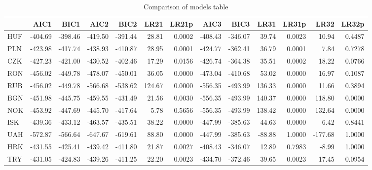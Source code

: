 \documentclass[12pt, a4paper, oneside]{article} %
\begin{document}

\begin{landscape}
\begin{table}[ht]
\centering
\begin{tabular}{l|rrrrrrrrrrrr}
  \hline
 & AIC1 & BIC1 & AIC2 & BIC2 & LR21 & LR21p & AIC3 & BIC3 & LR31 & LR31p & LR32 & LR32p \\ 
  \hline
HUF & -404.69 & -398.46 & -419.50 & -391.44 & 28.81 & 0.0002 & -408.43 & -346.07 & 39.74 & 0.0023 & 10.94 & 0.4487 \\ 
  PLN & -423.98 & -417.74 & -438.93 & -410.87 & 28.95 & 0.0001 & -424.77 & -362.41 & 36.79 & 0.0001 & 7.84 & 0.7278 \\ 
  CZK & -427.23 & -421.00 & -430.52 & -402.46 & 17.29 & 0.0156 & -426.74 & -364.38 & 35.51 & 0.0002 & 18.22 & 0.0766 \\ 
  RON & -456.02 & -449.78 & -478.07 & -450.01 & 36.05 & 0.0000 & -473.04 & -410.68 & 53.02 & 0.0000 & 16.97 & 0.1087 \\ 
  RUB & -456.02 & -449.78 & -566.68 & -538.62 & 124.67 & 0.0000 & -556.35 & -493.99 & 136.33 & 0.0000 & 11.66 & 0.3894 \\ 
  BGN & -451.98 & -445.75 & -459.55 & -431.49 & 21.56 & 0.0030 & -556.35 & -493.99 & 140.37 & 0.0000 & 118.80 & 0.0000 \\ 
  NOK & -453.92 & -447.69 & -445.70 & -417.64 & 5.78 & 0.5656 & -556.35 & -493.99 & 138.42 & 0.0000 & 132.64 & 0.0000 \\ 
  ISK & -439.36 & -433.12 & -463.57 & -435.51 & 38.22 & 0.0000 & -447.99 & -385.63 & 44.63 & 0.0000 & 6.42 & 0.8441 \\ 
  UAH & -572.87 & -566.64 & -647.67 & -619.61 & 88.80 & 0.0000 & -447.99 & -385.63 & -88.88 & 1.0000 & -177.68 & 1.0000 \\ 
  HRK & -431.55 & -425.41 & -439.42 & -411.80 & 21.87 & 0.0027 & -408.43 & -346.07 & 12.89 & 0.7983 & -8.99 & 1.0000 \\ 
  TRY & -431.05 & -424.83 & -439.26 & -411.25 & 22.20 & 0.0023 & -434.70 & -372.46 & 39.65 & 0.0023 & 17.45 & 0.0954 \\ 
   \hline
\end{tabular}
\caption{Comparison of models table} 
\label{tabref:comptab}
\end{table}
\end{landscape}
\end{document}
